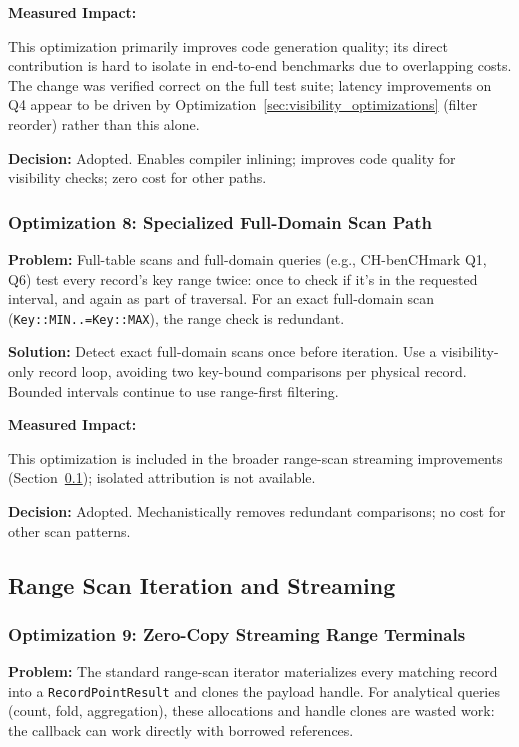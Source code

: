 \documentclass[11pt]{article}
\newcommand{\code}[1]{\texttt{#1}}
\begin{document}
\textbf{Measured Impact:}

This optimization primarily improves code generation quality; its direct contribution
is hard to isolate in end-to-end benchmarks due to overlapping costs. The change was
verified correct on the full test suite; latency improvements on Q4 appear to be
driven by Optimization~\ref{sec:visibility_optimizations} (filter reorder) rather
than this alone.

\textbf{Decision:} Adopted. Enables compiler inlining; improves code quality for
visibility checks; zero cost for other paths.

\subsubsection{Optimization 8: Specialized Full-Domain Scan Path}

\textbf{Problem:}
Full-table scans and full-domain queries (e.g., CH-benCHmark Q1, Q6) test every
record's key range twice: once to check if it's in the requested interval, and
again as part of traversal. For an exact full-domain scan (\code{Key::MIN..=Key::MAX}),
the range check is redundant.

\textbf{Solution:}
Detect exact full-domain scans once before iteration. Use a visibility-only record
loop, avoiding two key-bound comparisons per physical record. Bounded intervals
continue to use range-first filtering.

\textbf{Measured Impact:}

This optimization is included in the broader range-scan streaming improvements
(Section~\ref{sec:range_scans}); isolated attribution is not available.

\textbf{Decision:} Adopted. Mechanistically removes redundant comparisons; no cost
for other scan patterns.

\subsection{Range Scan Iteration and Streaming}
\label{sec:range_scans}

\subsubsection{Optimization 9: Zero-Copy Streaming Range Terminals}

\textbf{Problem:}
The standard range-scan iterator materializes every matching record into a
\code{RecordPointResult} and clones the payload handle. For analytical queries
(count, fold, aggregation), these allocations and handle clones are wasted work:
the callback can work directly with borrowed references.
\end{document}
